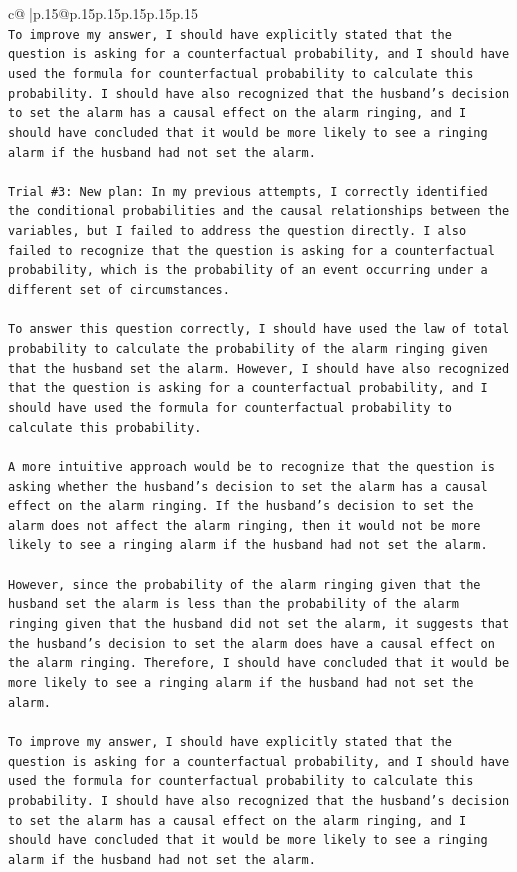 \documentclass{article}
\begin{document}
{\begin{supertabular}{c@{$\;$}|p{.15\linewidth}@{}p{.15\linewidth}p{.15\linewidth}p{.15\linewidth}p{.15\linewidth}p{.15\linewidth}}
{{{\\ 
\texttt{To improve my answer, I should have explicitly stated that the question is asking for a counterfactual probability, and I should have used the formula for counterfactual probability to calculate this probability. I should have also recognized that the husband's decision to set the alarm has a causal effect on the alarm ringing, and I should have concluded that it would be more likely to see a ringing alarm if the husband had not set the alarm.} \\
\\ 
\texttt{Trial \#3: New plan: In my previous attempts, I correctly identified the conditional probabilities and the causal relationships between the variables, but I failed to address the question directly. I also failed to recognize that the question is asking for a counterfactual probability, which is the probability of an event occurring under a different set of circumstances.} \\
\\ 
\texttt{To answer this question correctly, I should have used the law of total probability to calculate the probability of the alarm ringing given that the husband set the alarm. However, I should have also recognized that the question is asking for a counterfactual probability, and I should have used the formula for counterfactual probability to calculate this probability.} \\
\\ 
\texttt{A more intuitive approach would be to recognize that the question is asking whether the husband's decision to set the alarm has a causal effect on the alarm ringing. If the husband's decision to set the alarm does not affect the alarm ringing, then it would not be more likely to see a ringing alarm if the husband had not set the alarm.} \\
\\ 
\texttt{However, since the probability of the alarm ringing given that the husband set the alarm is less than the probability of the alarm ringing given that the husband did not set the alarm, it suggests that the husband's decision to set the alarm does have a causal effect on the alarm ringing. Therefore, I should have concluded that it would be more likely to see a ringing alarm if the husband had not set the alarm.} \\
\\ 
\texttt{To improve my answer, I should have explicitly stated that the question is asking for a counterfactual probability, and I should have used the formula for counterfactual probability to calculate this probability. I should have also recognized that the husband's decision to set the alarm has a causal effect on the alarm ringing, and I should have concluded that it would be more likely to see a ringing alarm if the husband had not set the alarm.} \\
}}}
\end{supertabular}}
\end{document}
